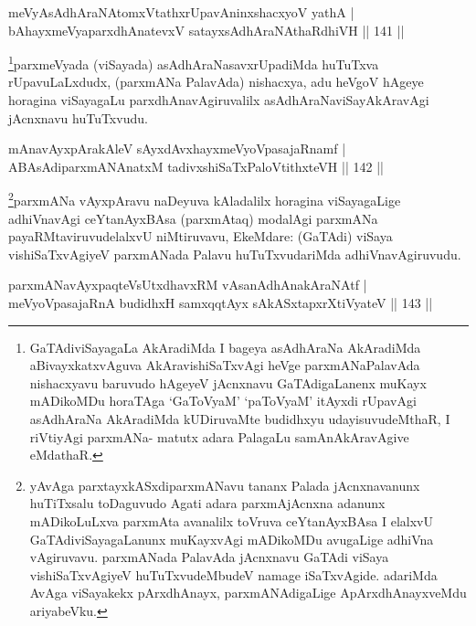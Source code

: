 
\begin{shl}
meVyAsAdhAraNAtomxVtathxrUpavAninxshacxyoV yathA |\\
bAhayxmeVyaparxdhAnatevxV satayxsAdhAraNAthaRdhiVH \hfill || 141 ||
\end{shl}

\begin{artha}
\footnote{GaTAdiviSayagaLa AkAradiMda I bageya asAdhAraNa AkAradiMda aBivayxkatxvAguva AkAravishiSaTxvAgi heVge parxmANaPalavAda nishacxyavu baruvudo hAgeyeV jAcnxnavu GaTAdigaLanenx muKayx mADikoMDu horaTAga `GaToV\s yaM' `paToV\s yaM' itAyxdi rUpavAgi asAdhAraNa AkAradiMda kUDiruvaMte budidhxyu udayisuvudeMthaR, I riVtiyAgi parxmANa- matutx adara PalagaLu samAnAkAravAgive eMdathaR.}parxmeVyada (viSayada) asAdhAraNasavxrUpadiMda huTuTxva rUpavuLaLxdudx, (parxmANa PalavAda) nishacxya, adu heVgoV hAgeye horagina viSayagaLu parxdhAnavAgiruvalilx asAdhAraNaviSayAkAravAgi jAcnxnavu huTuTxvudu.
\end{artha}


\begin{shl}
mAnavAyxpArakAleV sAyxdAvxhayxmeVyoVpasajaRnamf |\\
ABAsAdiparxmANAnatxM tadivxshiSaTxPaloVtithxteVH \hfill || 142 ||
\end{shl}

\begin{artha}
\footnote{yAvAga parxtayxkASxdiparxmANavu tananx Palada jAcnxnavanunx huTiTxsalu toDaguvudo Agati adara parxmAjAcnxna adanunx mADikoLuLxva parxmAta avanalilx toVruva ceYtanAyxBAsa I elalxvU GaTAdiviSayagaLanunx muKayxvAgi mADikoMDu avugaLige adhiVna vAgiruvavu. parxmANada PalavAda jAcnxnavu GaTAdi viSaya vishiSaTxvAgiyeV huTuTxvudeMbudeV namage iSaTxvAgide. adariMda AvAga viSayakekx pArxdhAnayx, parxmANAdigaLige ApArxdhAnayxveMdu ariyabeVku.}parxmANa vAyxpAravu naDeyuva kAladalilx horagina viSayagaLige adhiVnavAgi ceYtanAyxBAsa (parxmAtaq) modalAgi parxmANa payaRMtaviruvudelalxvU niMtiruvavu, EkeMdare: (GaTAdi) viSaya vishiSaTxvAgiyeV parxmANada Palavu huTuTxvudariMda adhiVnavAgiruvudu.
\end{artha}


\begin{shl}
parxmANavAyxpaqteVsUtxdhavxRM vAsanAdhAnakAraNAtf |\\
meVyoVpasajaRnA budidhxH samxqqtAyx sAkASxtapxrXtiVyateV \hfill || 143 ||
\end{shl}


